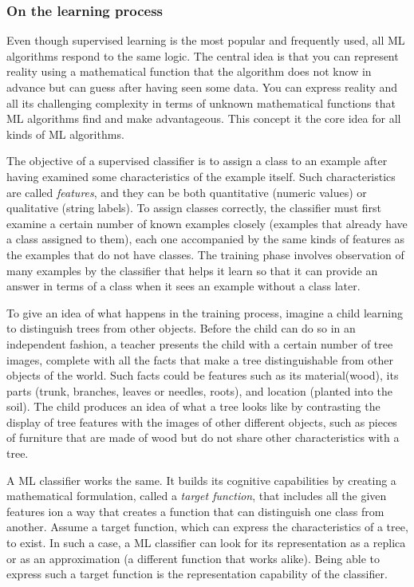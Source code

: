 \subsubsection{On the learning process}
\begin{mybox}{}
	Even though supervised learning is the most popular and frequently used, all ML algorithms respond to the same logic. The central idea is that you can represent reality using a mathematical function that the algorithm does not know in advance but can guess after having seen some data. You can express reality and all its challenging complexity in terms of unknown mathematical functions that ML algorithms find and make advantageous. This concept it the core idea for all kinds of ML algorithms.
\end{mybox}
The objective of a supervised classifier is to assign a class to an example after having examined some characteristics of the example itself. Such characteristics are called \emph{features}, and they can be both quantitative (numeric values) or qualitative (string labels). To assign classes correctly, the classifier must first examine a certain number of known examples closely (examples that already have a class assigned to them), each one accompanied by the same kinds of features as the examples that do not have classes. The training phase involves observation of many examples by the classifier that helps it learn so that it can provide an answer in terms of a class when it sees an example without a class later.
\begin{example}
	To give an idea of what happens in the training process, imagine a child learning to distinguish trees from other objects. Before the child can do so in an independent fashion, a teacher presents the child with a certain number of tree images, complete with all the facts that make a tree distinguishable from other objects of the world. Such facts could be features such as its material(wood), its parts (trunk, branches, leaves or needles, roots), and location (planted into the soil). The child produces an idea of what a tree looks like by contrasting the display of tree features with the images of other different objects, such as pieces of furniture that are made of wood but do not share other characteristics with a tree.
\end{example}
A ML classifier works the same. It builds its cognitive capabilities by creating a mathematical formulation, called a \emph{target function}, that includes all the given features ion a way that creates a function that can distinguish one class from another. Assume a target function, which can express the characteristics of a tree, to exist. In such a case, a ML classifier can look for its representation as a replica or as an approximation (a different function that works alike). Being able to express such a target function is the representation capability of the classifier.\\
